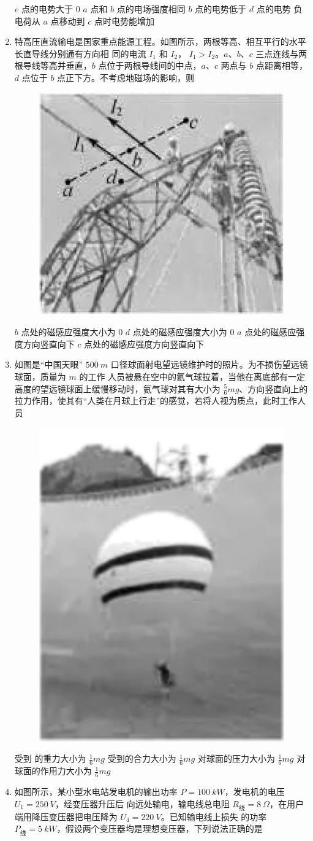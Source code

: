 \begin{enumerate}
\fourchoices
{$ e $ 点的电势大于 $ 0 $}
{$ a $ 点和 $ b $ 点的电场强度相同}
{$ b $ 点的电势低于 $ d $ 点的电势}
{负电荷从 $ a $ 点移动到 $ c $ 点时电势能增加}




\item
特高压直流输电是国家重点能源工程。如图所示，两根等高、相互平行的水平长直导线分别通有方向相
同的电流 $ I_{1} $ 和 $ I_{2} $， $ I_{1} > I_{2} $。$ a $、$ b $、$ c $ 三点连线与两根导线等高并垂直，$ b $ 点位于两根导线间的中点，$ a $、$ c $
两点与 $ b $ 点距离相等，$ d $ 点位于 $ b $ 点正下方。不考虑地磁场的影响，则  
\begin{figure}[h!]
\centering
\includegraphics[width=0.2\linewidth]{picture/screenshot046}
\end{figure}



\fourchoices
{$ b $ 点处的磁感应强度大小为 $ 0 $}
{$ d $ 点处的磁感应强度大小为 $ 0 $}
{$ a $ 点处的磁感应强度方向竖直向下}
{$ c $ 点处的磁感应强度方向竖直向下}



\item
如图是“中国天眼” $ 500 \ m $ 口径球面射电望远镜维护时的照片。为不损伤望远镜球面，质量为 $ m $ 的工作
人员被悬在空中的氦气球拉着，当他在离底部有一定高度的望远镜球面上缓慢移动时，氦气球对其有大小为
$ \frac{ 5 }{ 6 } mg $、方向竖直向上的拉力作用，使其有“人类在月球上行走”的感觉，若将人视为质点，此时工作人员  
\begin{figure}[h!]
\centering
\includegraphics[width=0.15\linewidth]{picture/screenshot047}
\end{figure}


\fourchoices
{受到 的重力大小为 $ \frac{ 1 }{ 6 } mg $}
{受到的合力大小为 $ \frac{ 1 }{ 6 } mg $}
{对球面的压力大小为 $ \frac{ 1 }{ 6 } mg $}
{对球面的作用力大小为 $ \frac{ 1 }{ 6 } mg $}


\item
如图所示，某小型水电站发电机的输出功率 $ P=100 \ kW $，发电机的电压 $ U_{1} =250 \ V $，经变压器升压后
向远处输电，输电线总电阻 $ R _{ \text{线} } =8 \ \Omega $，在用户端用降压变压器把电压降为 $ U_4=220 \ V $。已知输电线上损失
的功率 $ P _{ \text{线} } =5 \ kW $，假设两个变压器均是理想变压器，下列说法正确的是  
\begin{figure}[h!]
\centering

\end{figure}



\end{enumerate}

